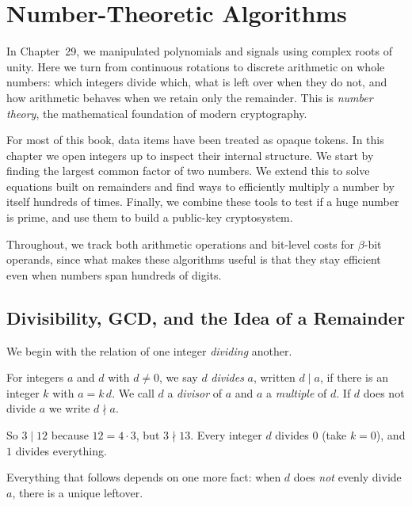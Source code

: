 \chapter{Number-Theoretic Algorithms}


In Chapter~29, we manipulated polynomials and signals using complex roots of unity. Here we turn from continuous rotations to discrete arithmetic on whole numbers: which integers divide which, what is left over when they do not, and how arithmetic behaves when we retain only the remainder. This is \emph{number theory}, the mathematical foundation of modern cryptography.

For most of this book, data items have been treated as opaque tokens. In this chapter we open integers up to inspect their internal structure. We start by finding the largest common factor of two numbers. We extend this to solve equations built on remainders and find ways to efficiently multiply a number by itself hundreds of times. Finally, we combine these tools to test if a huge number is prime, and use them to build a public-key cryptosystem.

Throughout, we track both arithmetic operations and bit-level costs for $\beta$-bit operands, since what makes these algorithms useful is that they stay efficient even when numbers span hundreds of digits.

\chapterline

\section{Divisibility, GCD, and the Idea of a Remainder}
\label{ch30:divisibility}

We begin with the relation of one integer \emph{dividing} another.

\begin{definition}[Divisibility]
\label{ch30:def-divides}
For integers $a$ and $d$ with $d \neq 0$, we say $d$ \emph{divides} $a$, written
$d \mid a$, if there is an integer $k$ with $a = k\,d$. We call $d$ a
\emph{divisor} of $a$ and $a$ a \emph{multiple} of $d$. If $d$ does not divide
$a$ we write $d \nmid a$.
\end{definition}

So $3 \mid 12$ because $12 = 4 \cdot 3$, but $3 \nmid 13$. Every integer $d$
divides $0$ (take $k = 0$), and $1$ divides everything.

Everything that follows depends on one more fact: when $d$ does \emph{not}
evenly divide $a$, there is a unique leftover.

